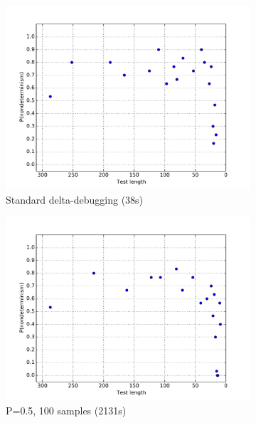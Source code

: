 \begin{figure}
\centering 
\begin{subfigure}{0.67\columnwidth}
\centering
\includegraphics[width=\columnwidth]{redisddmin}
\caption{Standard delta-debugging (38s)}
\label{fig:r1}
\end{subfigure}
\begin{subfigure}{0.67\columnwidth}
\centering
\includegraphics[width=\columnwidth]{redisforcep}
\caption{P=0.5, 100 samples (2131s)}
\label{fig:r2}
\end{subfigure}
\begin{subfigure}{0.67\columnwidth}
\centering

\end{subfigure}
\end{figure}
